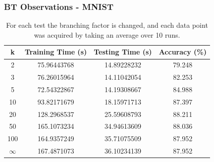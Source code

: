 \documentclass[pdf]{beamer}
\begin{document}
	\begin{frame}
	\frametitle{BT Observations - MNIST}
		\begin{table}
			\begin{tabular}{|c|c|c|c|}
				\hline 
				\rule[-1ex]{0pt}{2.5ex} \textbf{k} & \textbf{Training Time (s)} & \textbf{Testing Time (s)} & \textbf{Accuracy (\%)} \\ 
				\hline 
				\rule[-1ex]{0pt}{2.5ex} 2 & 75.96443768
 & 14.89228232 & 79.248 \\ 
				\hline 
				\rule[-1ex]{0pt}{2.5ex} 3 & 76.26015964 & 14.11042054 & 82.253 \\ 
				\hline 
				\rule[-1ex]{0pt}{2.5ex} 5 & 72.54322867 & 14.19308667 & 84.988 \\ 
				\hline 
				\rule[-1ex]{0pt}{2.5ex} 10 & 93.82171679 & 18.15971713 & 87.397 \\ 
				\hline 
				\rule[-1ex]{0pt}{2.5ex} 20 & 128.2968537 & 25.59608793 & 88.211 \\ 
				\hline 
				\rule[-1ex]{0pt}{2.5ex} 50 & 165.1073234 & 34.94613609 & 88.036 \\ 
				\hline 
				\rule[-1ex]{0pt}{2.5ex} 100 & 164.9357249 & 35.71075509 & 87.952 \\ 
				\hline 
				\rule[-1ex]{0pt}{2.5ex} $\infty$ & 167.4871073 & 36.10234139 & 87.952 \\ 
				\hline 
			\end{tabular} 
			\caption{For each test the branching factor is changed, and each data point was acquired by taking an average over 10 runs.}
		\end{table}
	\end{frame}
\end{document}
